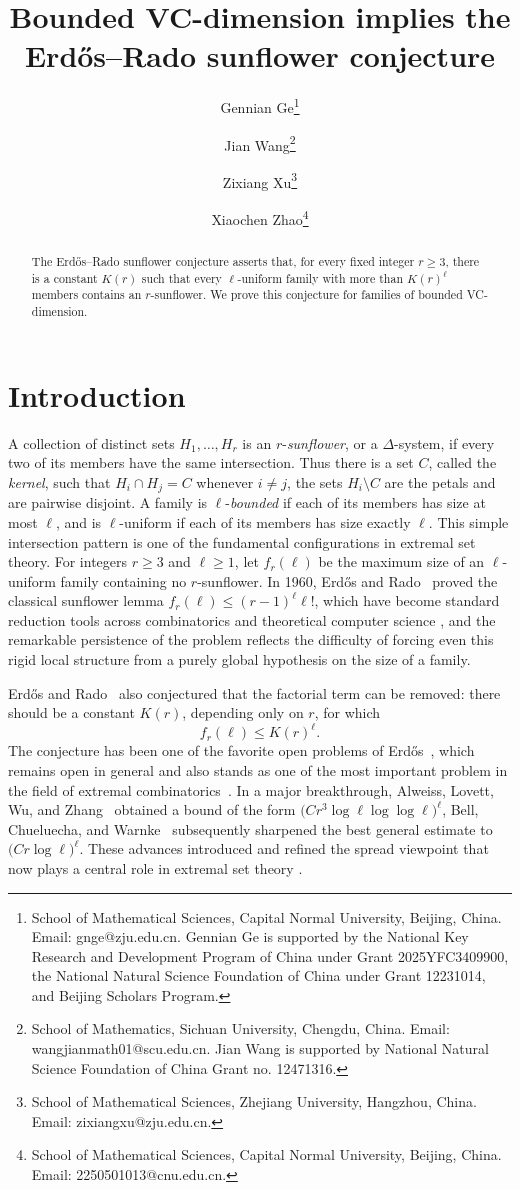 \documentclass[11pt]{article}
\title{Bounded VC-dimension implies the Erd\H{o}s--Rado sunflower conjecture}
\author{
Gennian Ge\thanks{School of Mathematical Sciences, Capital Normal University, Beijing, China. Email: gnge@zju.edu.cn. Gennian Ge is supported by the National Key Research and Development Program of China under Grant 2025YFC3409900, the National Natural Science Foundation of China under Grant 12231014, and Beijing Scholars Program.}
\and
Jian Wang\thanks{School of Mathematics, Sichuan University,
Chengdu, China. Email: wangjianmath01@scu.edu.cn. Jian Wang is supported by National Natural Science
Foundation of China Grant no. 12471316.}
\and
Zixiang Xu\thanks{School of Mathematical Sciences, Zhejiang University, Hangzhou, China. Email: zixiangxu@zju.edu.cn.}
\and
Xiaochen Zhao\thanks{School of Mathematical Sciences, Capital Normal University, Beijing, China. Email: 2250501013@cnu.edu.cn.}
}
\date{}
\theoremstyle{definition}
\begin{document}
\maketitle


\begin{abstract}
The Erd\H{o}s--Rado sunflower conjecture asserts that, for every fixed integer \(r\ge 3\), there is a constant \(K(r)\) such that every \(\ell\)-uniform family with more than \(K(r)^{\ell}\) members contains an \(r\)-sunflower. We prove this conjecture for families of bounded VC-dimension.
\end{abstract}

\section{Introduction}

A collection of distinct sets \(H_{1},\ldots,H_{r}\) is an \(r\)-\emph{sunflower}, or a \(\Delta\)-system, if every two of its members have the same intersection. Thus there is a set \(C\), called the \emph{kernel}, such that \(H_{i}\cap H_{j}=C\) whenever \(i\ne j\), the sets \(H_{i}\setminus C\) are the petals and are pairwise disjoint. A family is \(\ell\)-\emph{bounded} if each of its members has size at most \(\ell\), and is \(\ell\)-uniform if each of its members has size exactly \(\ell\). This simple intersection pattern is one of the fundamental configurations in extremal set theory. For integers \(r\ge 3\) and \(\ell\ge 1\), let \(f_{r}(\ell)\) be the maximum size of an \(\ell\)-uniform family containing no \(r\)-sunflower. In 1960, Erd\H{o}s and Rado~\cite{ER60} proved the classical sunflower lemma \(f_{r}(\ell)\le (r-1)^{\ell}\ell!\), which have become standard reduction tools across combinatorics and theoretical computer science \cite{AB87,CKR22,DV25,FLSZ19,GMR13,LLZ18,LMMPZ22,NSR18,RA20,Rao26,R85}, and the remarkable persistence of the problem reflects the difficulty of forcing even this rigid local structure from a purely global hypothesis on the size of a family.

Erd\H{o}s and Rado~\cite{ER60} also conjectured that the factorial term can be removed: there should be a constant \(K(r)\), depending only on \(r\), for which
\[
f_{r}(\ell)\le K(r)^{\ell}.
\]
The conjecture has been one of the favorite open problems of Erd\H{o}s~\cite{E81}, which remains open in general and also stands as one of the most important problem in the field of extremal combinatorics~\cite{ErdosProblem}. In a major breakthrough, Alweiss, Lovett, Wu, and Zhang~\cite{ALWZ21} obtained a bound of the form \(\bigl(Cr^{3}\log \ell\log\log \ell\bigr)^{\ell}\), Bell, Chueluecha, and Warnke~\cite{BCW21} subsequently sharpened the best general estimate to \(\bigl(Cr\log \ell\bigr)^{\ell}\). These advances introduced and refined the spread viewpoint that now plays a central role in extremal set theory
\cite{BDGGL26,FHIKLMP25,FK25,INST25,KLS25,KN24,KZD24,WX26}.
\end{document}
